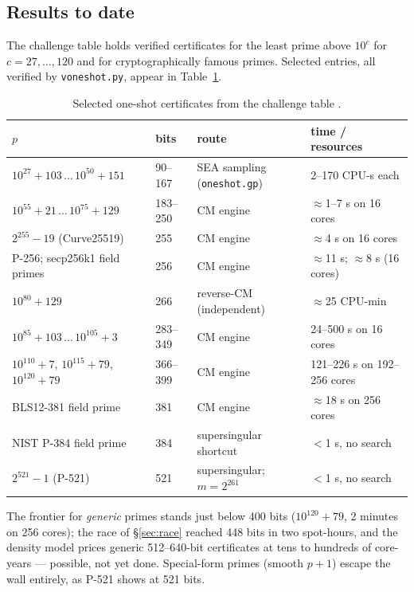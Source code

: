 \documentclass[11pt]{amsart}
\newcommand{\osf}{\cite{OSF}}
\theoremstyle{plain}
\theoremstyle{definition}
\theoremstyle{remark}
\begin{document}
\subsection{Results to date}\label{sec:oneshotresults}

The challenge table \cite{OneShot} holds verified certificates for the least prime above $10^c$ for
$c = 27, \dots, 120$ and for cryptographically famous primes.  Selected entries, all verified by
\texttt{voneshot.py}, appear in Table~\ref{tab:oneshotresults}.

\begin{table}[htbp]
\centering\footnotesize
\begin{tabular}{@{}llll@{}}
\toprule
$p$ & bits & route & time / resources\\
\midrule
$10^{27}+103 \,\dots\, 10^{50}+151$ & 90--167 & SEA sampling (\texttt{oneshot.gp}) & 2--170 CPU-s each\\
$10^{55}+21 \,\dots\, 10^{75}+129$ & 183--250 & CM engine \osf & ${\approx}$1--7 s on 16 cores\\
$2^{255}-19$ (Curve25519) & 255 & CM engine & ${\approx}$4 s on 16 cores\\
P-256; secp256k1 field primes & 256 & CM engine & ${\approx}$11 s; ${\approx}$8 s (16 cores)\\
$10^{80}+129$ & 266 & reverse-CM (independent) & ${\approx}$25 CPU-min\\
$10^{85}+103 \,\dots\, 10^{105}+3$ & 283--349 & CM engine & 24--500 s on 16 cores\\
$10^{110}+7$, $10^{115}+79$, $10^{120}+79$ & 366--399 & CM engine & 121--226 s on 192--256 cores\\
BLS12-381 field prime & 381 & CM engine & ${\approx}$18 s on 256 cores\\
NIST P-384 field prime & 384 & supersingular shortcut & ${<}$1 s, no search\\
$2^{521}-1$ (P-521) & 521 & supersingular; $m = 2^{261}$ & ${<}$1 s, no search\\
\bottomrule
\end{tabular}
\medskip
\caption{Selected one-shot certificates from the challenge table \cite{OneShot}.}
\label{tab:oneshotresults}
\end{table}

The frontier for \emph{generic} primes stands just below 400 bits ($10^{120}+79$, 2 minutes on 256
cores); the race of \S\ref{sec:race} reached 448 bits in two spot-hours, and the density model prices
generic 512--640-bit certificates at tens to hundreds of core-years --- possible, not yet done.
Special-form primes (smooth $p+1$) escape the wall entirely, as P-521 shows at 521 bits.
\end{document}
